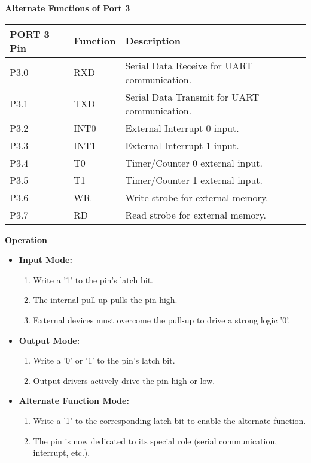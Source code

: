 \documentclass[
]{article}
\begin{document}
\textbf{Alternate Functions of Port 3}

\begin{longtable}[]{@{}lll@{}}
\toprule
PORT 3 Pin & Function & Description \\
\midrule
\endhead
P3.0 & RXD & Serial Data Receive for UART communication. \\
P3.1 & TXD & Serial Data Transmit for UART communication. \\
P3.2 & INT0 & External Interrupt 0 input. \\
P3.3 & INT1 & External Interrupt 1 input. \\
P3.4 & T0 & Timer/Counter 0 external input. \\
P3.5 & T1 & Timer/Counter 1 external input. \\
P3.6 & WR & Write strobe for external memory. \\
P3.7 & RD & Read strobe for external memory. \\
\bottomrule
\end{longtable}

\textbf{Operation}

\begin{itemize}
\item
  \textbf{Input Mode:}

  \begin{enumerate}
  \def\labelenumi{\arabic{enumi}.}
  \item
    Write a '1' to the pin's latch bit.
  \item
    The internal pull-up pulls the pin high.
  \item
    External devices must overcome the pull-up to drive a strong logic
    '0'.
  \end{enumerate}
\item
  \textbf{Output Mode:}

  \begin{enumerate}
  \def\labelenumi{\arabic{enumi}.}
  \item
    Write a '0' or '1' to the pin's latch bit.
  \item
    Output drivers actively drive the pin high or low.
  \end{enumerate}
\item
  \textbf{Alternate Function Mode:}

  \begin{enumerate}
  \def\labelenumi{\arabic{enumi}.}
  \item
    Write a '1' to the corresponding latch bit to enable the alternate
    function.
  \item
    The pin is now dedicated to its special role (serial communication,
    interrupt, etc.).
  \end{enumerate}
\end{itemize}
\end{document}

